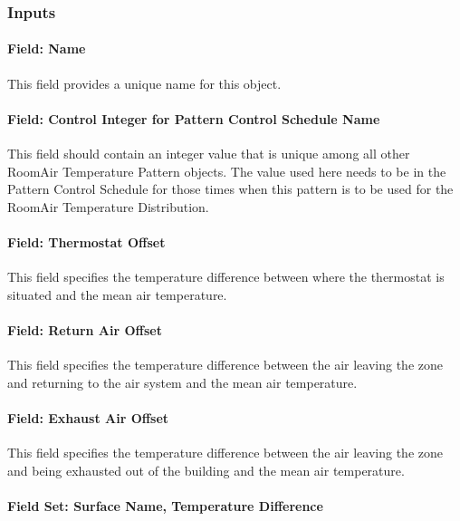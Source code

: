 \subsubsection{Inputs}\label{inputs-5-025}

\paragraph{Field: Name}\label{field-name-5-020}

This field provides a unique name for this object.

\paragraph{Field: Control Integer for Pattern Control Schedule Name}\label{field-control-integer-for-pattern-control-schedule-name-3}

This field should contain an integer value that is unique among all other RoomAir Temperature Pattern objects. The value used here needs to be in the Pattern Control Schedule for those times when this pattern is to be used for the RoomAir Temperature Distribution.

\paragraph{Field: Thermostat Offset}\label{field-thermostat-offset-2}

This field specifies the temperature difference between where the thermostat is situated and the mean air temperature.

\paragraph{Field: Return Air Offset}\label{field-return-air-offset-2}

This field specifies the temperature difference between the air leaving the zone and returning to the air system and the mean air temperature.

\paragraph{Field: Exhaust Air Offset}\label{field-exhaust-air-offset-2}

This field specifies the temperature difference between the air leaving the zone and being exhausted out of the building and the mean air temperature.

\paragraph{Field Set: Surface Name, Temperature Difference}\label{field-set-surface-name-temperature-difference}


